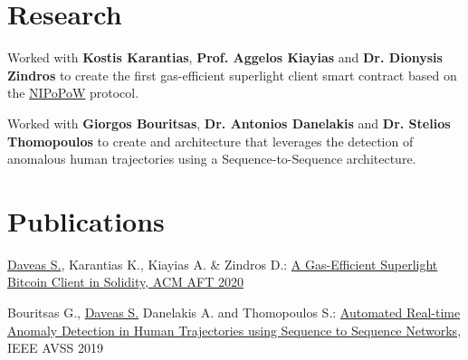 \documentclass[]{deedy-resume-openfont}
\begin{document}
\begin{minipage}[t]{0.66\textwidth}

\section{Research}
Worked with
\textbf{Kostis Karantias},
\textbf{Prof. Aggelos Kiayias} and \textbf{Dr. Dionysis Zindros} to create the
first gas-efficient superlight client smart contract based on the
\href{https://www.nipopows.com}{NIPoPoW} protocol.

Worked with
\textbf{Giorgos Bouritsas},
\textbf{Dr. Antonios Danelakis} and \textbf{Dr. Stelios Thomopoulos} to create
and architecture that leverages the detection of anomalous human trajectories
using a Sequence-to-Sequence architecture.
\sectionsep


\section{Publications}

\underline{Daveas S.}, Karantias K., Kiayias A. \& Zindros D.: \href{https://dl.acm.org/doi/abs/10.1145/3419614.3423255?casa_token=NmylSoSMSJgAAAAA:yOyuE4bgCLLp8HQP0MHzGegNr6IVBofjx77nBAiDxN6WzWIzarMpyMD14UMf5Wki-guZkenxekT2qw}{A Gas-Efficient
Superlight Bitcoin Client in Solidity, ACM AFT 2020}

Bouritsas G., \underline{Daveas S.} Danelakis A. and Thomopoulos S.:
\href{https://ieeexplore.ieee.org/abstract/document/8909844/?casa_token=NlZHO6W9_ewAAAAA:2Q2vSiR0ynu72R9iaYASHe5FzuNVAtfDrmnj0VmEk1sBZ-P74vnzKELd71hpL59byzko7acsjf5Nlw}{
Automated Real-time Anomaly Detection in Human Trajectories using Sequence to
Sequence Networks},
IEEE AVSS 2019
\sectionsep

\end{minipage}
\end{document}
